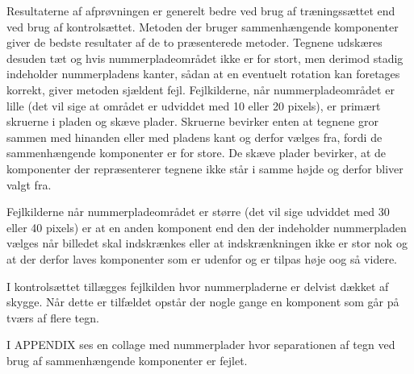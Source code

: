 
Resultaterne af afprøvningen er generelt bedre ved brug af træningssættet end ved brug af kontrolsættet. Metoden der bruger sammenhængende komponenter giver de bedste resultater af de to præsenterede metoder. Tegnene udskæres desuden tæt og hvis nummerpladeområdet ikke er for stort, men derimod stadig indeholder nummerpladens kanter, sådan at en eventuelt rotation kan foretages korrekt, giver metoden sjældent fejl. Fejlkilderne, når nummerpladeområdet er lille (det vil sige at området er udviddet med 10 eller 20 pixels), er primært skruerne i pladen og skæve plader. Skruerne bevirker enten at tegnene gror sammen med hinanden eller med pladens kant og derfor vælges fra, fordi de sammenhængende komponenter er for store. De skæve plader bevirker, at de komponenter der repræsenterer tegnene ikke står i samme højde og derfor bliver valgt fra.


Fejlkilderne når nummerpladeområdet er større (det vil sige udviddet med 30 eller 40 pixels) er at en anden komponent end den der indeholder nummerpladen vælges når billedet skal indskrænkes eller at indskrænkningen ikke er stor nok og at der derfor laves komponenter som er udenfor og er tilpas høje oog så videre.


I kontrolsættet tillægges fejlkilden hvor nummerpladerne er delvist dækket af skygge. Når dette er tilfældet opstår der nogle gange en komponent som går på tværs af flere tegn.

I APPENDIX ses en collage med nummerplader hvor separationen af tegn ved brug af sammenhængende komponenter er fejlet.



